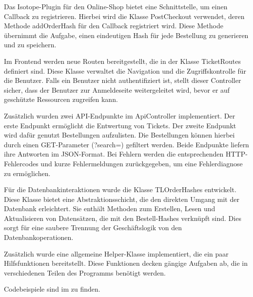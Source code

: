Das Isotope-Plugin für den Online-Shop bietet eine Schnittstelle, um einen Callback zu registrieren. Hierbei wird die Klasse PostCheckout verwendet, deren Methode addOrderHash für den Callback registriert wird. Diese Methode übernimmt die Aufgabe, einen eindeutigen Hash für jede Bestellung zu generieren und zu speichern.

Im Frontend werden neue Routen bereitgestellt, die in der Klasse TicketRoutes definiert sind. Diese Klasse verwaltet die Navigation und die Zugriffskontrolle für die Benutzer. Falls ein Benutzer nicht authentifiziert ist, stellt dieser Controller sicher, dass der Benutzer zur Anmeldeseite weitergeleitet wird, bevor er auf geschützte Ressourcen zugreifen kann.

Zusätzlich wurden zwei API-Endpunkte im ApiController implementiert. Der erste Endpunkt ermöglicht die Entwertung von Tickets. Der zweite Endpunkt wird dafür genutzt Bestellungen aufzulisten. Die Bestellungen können hierbei durch einen GET-Parameter (?search=) gefiltert werden. Beide Endpunkte liefern ihre Antworten im JSON-Format. Bei Fehlern werden die entsprechenden HTTP-Fehlercodes und kurze Fehlermeldungen zurückgegeben, um eine Fehlerdiagnose zu ermöglichen.

Für die Datenbankinteraktionen wurde die Klasse TLOrderHashes entwickelt. Diese Klasse bietet eine Abstraktionsschicht, die den direkten Umgang mit der Datenbank erleichtert. Sie enthält Methoden zum Erstellen, Lesen und Aktualisieren von Datensätzen, die mit den Bestell-Hashes verknüpft sind. Dies sorgt für eine saubere Trennung der Geschäftslogik von den Datenbankoperationen.

Zusätzlich wurde eine allgemeine Helper-Klasse implementiert, die ein paar Hilfsfunktionen bereitstellt. Diese Funktionen decken gängige Aufgaben ab, die in verschiedenen Teilen des Programms benötigt werden.

Codebeispiele sind im  zu finden.  
